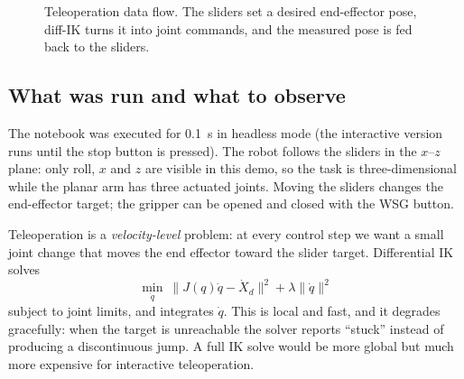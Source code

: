 \documentclass[11pt]{article}
\begin{document}
\begin{figure}[htbp]
\centering
{}
\caption{Teleoperation data flow.  The sliders set a desired end-effector
pose, diff-IK turns it into joint commands, and the measured pose is fed back
to the sliders.}
\label{fig:teleop}
\end{figure}

\subsection{What was run and what to observe}

The notebook was executed for 0.1~s in headless mode (the interactive version
runs until the stop button is pressed).  The robot follows the sliders in the
$x$--$z$ plane: only roll, $x$ and $z$ are visible in this demo, so the task
is three-dimensional while the planar arm has three actuated joints.  Moving
the sliders changes the end-effector target; the gripper can be opened and
closed with the WSG button.

\begin{intuition}[title={Why use differential IK instead of inverse kinematics?}]
Teleoperation is a \emph{velocity-level} problem: at every control step we
want a small joint change that moves the end effector toward the slider
target.  Differential IK solves
\[
\min_{\dot q}\ \|J(q)\dot q-\dot X_d\|^2+\lambda\|\dot q\|^2
\]
subject to joint limits, and integrates $\dot q$.  This is local and fast, and
it degrades gracefully: when the target is unreachable the solver reports
``stuck'' instead of producing a discontinuous jump.  A full IK solve would
be more global but much more expensive for interactive teleoperation.
\end{intuition}
\end{document}
